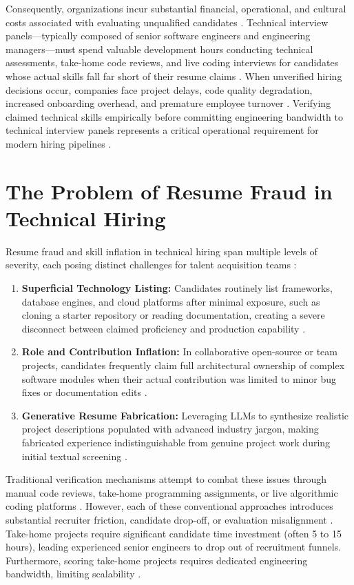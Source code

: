 Consequently, organizations incur substantial financial, operational, and cultural costs associated with evaluating unqualified candidates \cite{ref20}. Technical interview panels—typically composed of senior software engineers and engineering managers—must spend valuable development hours conducting technical assessments, take-home code reviews, and live coding interviews for candidates whose actual skills fall far short of their resume claims \cite{ref4, ref21}. When unverified hiring decisions occur, companies face project delays, code quality degradation, increased onboarding overhead, and premature employee turnover \cite{ref14, ref22}. Verifying claimed technical skills empirically before committing engineering bandwidth to technical interview panels represents a critical operational requirement for modern hiring pipelines \cite{ref12, ref23}.

\section{The Problem of Resume Fraud in Technical Hiring}

Resume fraud and skill inflation in technical hiring span multiple levels of severity, each posing distinct challenges for talent acquisition teams \cite{ref9, ref10}:

\begin{enumerate}[leftmargin=*, label=\arabic*.]
    \item \textbf{Superficial Technology Listing:} Candidates routinely list frameworks, database engines, and cloud platforms after minimal exposure, such as cloning a starter repository or reading documentation, creating a severe disconnect between claimed proficiency and production capability \cite{ref11, ref12}.
    \item \textbf{Role and Contribution Inflation:} In collaborative open-source or team projects, candidates frequently claim full architectural ownership of complex software modules when their actual contribution was limited to minor bug fixes or documentation edits \cite{ref15, ref16, ref24}.
    \item \textbf{Generative Resume Fabrication:} Leveraging LLMs to synthesize realistic project descriptions populated with advanced industry jargon, making fabricated experience indistinguishable from genuine project work during initial textual screening \cite{ref5, ref17}.
\end{enumerate}

Traditional verification mechanisms attempt to combat these issues through manual code reviews, take-home programming assignments, or live algorithmic coding platforms \cite{ref4, ref15}. However, each of these conventional approaches introduces substantial recruiter friction, candidate drop-off, or evaluation misalignment \cite{ref21}. Take-home projects require significant candidate time investment (often 5 to 15 hours), leading experienced senior engineers to drop out of recruitment funnels. Furthermore, scoring take-home projects requires dedicated engineering bandwidth, limiting scalability \cite{ref16, ref25}.

